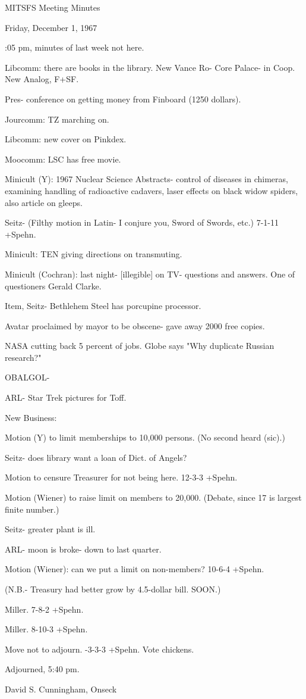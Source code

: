 \documentclass[12pt]{article}
\begin{document}
\begin{center}

MITSFS Meeting Minutes

Friday, December 1, 1967

\end{center}
 
\vspace{12pt}

\setlength{\parskip}{6pt}

:05 pm, minutes of last week not here.

Libcomm: there are books in the library. New Vance Ro- Core Palace- in Coop. New Analog, F+SF.

Pres- conference on getting money from Finboard (1250 dollars).

Jourcomm: TZ marching on.

Libcomm: new cover on Pinkdex.

Moocomm: LSC has free movie.

Minicult (Y): 1967 Nuclear Science Abstracts- control of diseases in chimeras, examining handling of radioactive cadavers, laser effects on black widow spiders, also article on gleeps.

Seitz- (Filthy motion in Latin- I conjure you, Sword of Swords, etc.) 7-1-11 +Spehn.

Minicult: TEN giving directions on transmuting.

Minicult (Cochran): last night- [illegible] on TV- questions and answers. One of questioners Gerald Clarke.

Item, Seitz- Bethlehem Steel has porcupine processor.

Avatar proclaimed by mayor to be obscene- gave away 2000 free copies.

NASA cutting back 5 percent of jobs. Globe says "Why duplicate Russian research?"

OBALGOL-

ARL- Star Trek pictures for Toff.

New Business:

Motion (Y) to limit memberships to 10,000 persons. (No second heard (sic).)

Seitz- does library want a loan of Dict. of Angels?

Motion to censure Treasurer for not being here. 12-3-3 +Spehn.

Motion (Wiener) to raise limit on members to 20,000. (Debate, since 17 is largest finite number.)

Seitz- greater plant is ill.

ARL- moon is broke- down to last quarter.

Motion (Wiener): can we put a limit on non-members? 10-6-4 +Spehn.

(N.B.- Treasury had better grow by 4.5-dollar bill. SOON.)

Miller. 7-8-2 +Spehn.

Miller. 8-10-3 +Spehn.

Move not to adjourn. -3-3-3 +Spehn. Vote chickens.

Adjourned, 5:40 pm.

\vspace{12pt}

\centerline{David S. Cunningham, Onseck}
\end{document}
